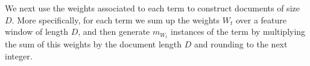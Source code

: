 We next use the weights associated to each term to construct documents of size $D$. More specifically, for each term we sum up the weights $W_{t}$ over a feature window of length $D$, and then generate $m_{W_{t}}$ instances of the term by multiplying the sum of this weights by the document length $D$ and rounding to the next integer. 

